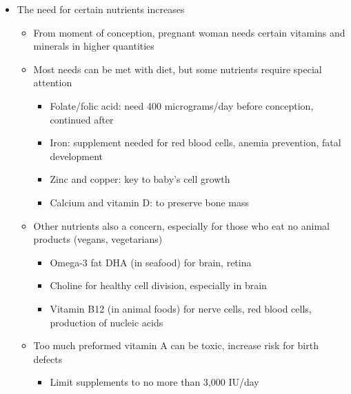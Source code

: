 \documentclass[12pt]{article}
\begin{document}
\begin{itemize}
\begin{itemize}
\begin{itemize}
                            \end{itemize}
                    \end{itemize}
                \item The need for certain nutrients increases
                    \begin{itemize}
                        \item From moment of conception, pregnant woman needs certain vitamins and minerals in higher quantities
                        \item Most needs can be met with diet, but some nutrients require special attention
                            \begin{itemize}
                                \item Folate/folic acid: need 400 micrograms/day before conception, continued after
                                \item Iron: supplement needed for red blood cells, anemia prevention, fatal development
                                \item Zinc and copper: key to baby's cell growth
                                \item Calcium and vitamin D: to preserve bone mass
                            \end{itemize}
                        \item Other nutrients also a concern, especially for those who eat no animal products (vegans, vegetarians)
                            \begin{itemize}
                                \item Omega-3 fat DHA (in seafood) for brain, retina
                                \item Choline for healthy cell division, especially in brain
                                \item Vitamin B12 (in animal foods) for nerve cells, red blood cells, production of nucleic acids
                            \end{itemize}
                        \item Too much preformed vitamin A can be toxic, increase risk for birth defects
                            \begin{itemize}
                                \item Limit supplements to no more than 3,000 IU/day
                            \end{itemize}
                    \end{itemize}

\end{itemize}
\end{document}
